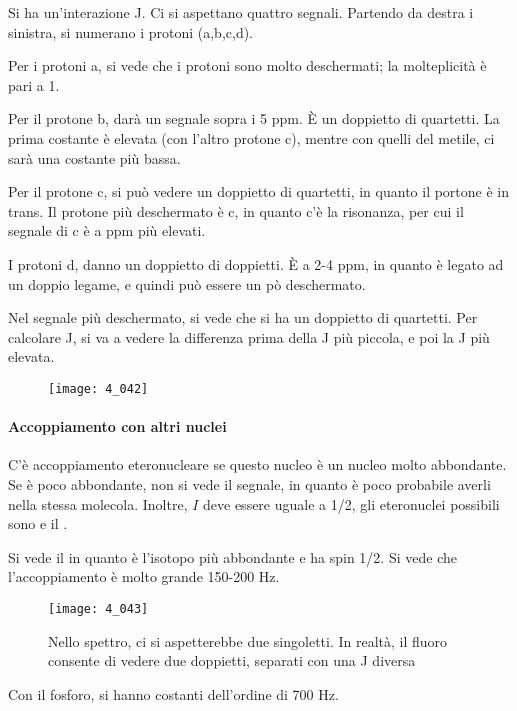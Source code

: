 
Si ha un'interazione J. Ci si aspettano quattro segnali. Partendo da destra i sinistra, si numerano i protoni (a,b,c,d).

Per i protoni a, si vede che i protoni sono molto deschermati; la molteplicità è pari a 1.

Per il protone b, darà un segnale sopra i 5 ppm. È un doppietto di quartetti. La prima costante è elevata (con l'altro protone c), mentre con quelli del metile, ci sarà una costante più bassa.

Per il protone c, si può vedere un doppietto di quartetti, in quanto il portone è in trans. Il protone più deschermato è c, in quanto c'è la risonanza, per cui il segnale di c è a ppm più elevati.

I protoni d, danno un doppietto di doppietti. È a 2-4 ppm, in quanto è legato ad un doppio legame, e quindi può essere un pò deschermato.

Nel segnale più deschermato, si vede che si ha un doppietto di quartetti. Per calcolare J, si va a vedere la differenza prima della J più piccola, e poi la J più elevata.

\begin{figure}
  \texttt{[image: 4\_042]}
\end{figure}

\paragraph{Accoppiamento con altri nuclei}

C'è accoppiamento eteronucleare se questo nucleo è un nucleo molto abbondante. Se è poco abbondante, non si vede il segnale, in quanto è poco probabile averli nella stessa molecola. Inoltre, $I$ deve essere uguale a 1/2, gli eteronuclei possibili sono  e il .

Si vede il  in quanto è l'isotopo più abbondante e ha spin 1/2. Si
vede che l'accoppiamento è molto grande 150-200 Hz.

\begin{figure}
  \texttt{[image: 4\_043]}
  \caption*{Nello spettro, ci si aspetterebbe due singoletti. In realtà, il fluoro
  consente di vedere due doppietti, separati con una J diversa}
\end{figure}

Con il fosforo, si hanno costanti dell'ordine di 700 Hz.


